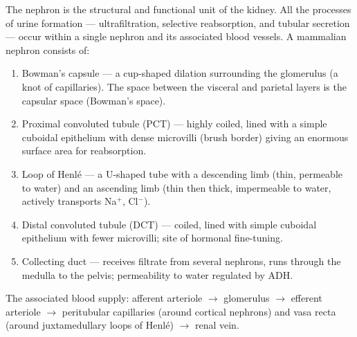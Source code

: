\documentclass[11pt]{article}
\newcommand{\cle}[1]{{\popxbold\color{popdark}#1}}
\begin{document}
\begin{propriete}
The nephron is the structural and functional unit of the kidney. All the processes of urine formation — ultrafiltration, selective reabsorption, and tubular secretion — occur within a single nephron and its associated blood vessels. A mammalian nephron consists of:
\begin{enumerate}
\item \cle{Bowman's capsule} — a cup-shaped dilation surrounding the \cle{glomerulus} (a knot of capillaries). The space between the visceral and parietal layers is the \cle{capsular space} (Bowman's space).
\item \cle{Proximal convoluted tubule (PCT)} — highly coiled, lined with a simple cuboidal epithelium with dense \cle{microvilli} (brush border) giving an enormous surface area for reabsorption.
\item \cle{Loop of Henlé} — a U-shaped tube with a \cle{descending limb} (thin, permeable to water) and an \cle{ascending limb} (thin then thick, impermeable to water, actively transports Na$^+$, Cl$^-$).
\item \cle{Distal convoluted tubule (DCT)} — coiled, lined with simple cuboidal epithelium with fewer microvilli; site of hormonal fine-tuning.
\item \cle{Collecting duct} — receives filtrate from several nephrons, runs through the medulla to the pelvis; permeability to water regulated by ADH.
\end{enumerate}
The associated blood supply: \cle{afferent arteriole} $\to$ \cle{glomerulus} $\to$ \cle{efferent arteriole} $\to$ \cle{peritubular capillaries} (around cortical nephrons) and \cle{vasa recta} (around juxtamedullary loops of Henlé) $\to$ \cle{renal vein}.
\end{propriete}
\end{document}
